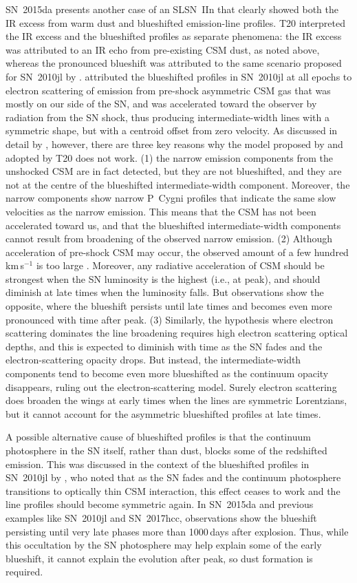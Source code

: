 \documentclass[fleqn,usenatbib,useAMS]{mnras}
\begin{document}
SN~2015da presents another case of an SLSN~IIn that clearly showed both
the IR excess from warm dust and blueshifted emission-line profiles.
T20 interpreted the IR excess and the blueshifted profiles as separate
phenomena: the IR excess was attributed to an IR echo from
pre-existing CSM dust, as noted above, whereas the pronounced
blueshift was attributed to the same scenario proposed for SN~2010jl
by \citet{fransson14}.  \citet{fransson14} attributed the blueshifted
profiles in SN~2010jl at all epochs to electron scattering of emission
from pre-shock asymmetric CSM gas that was mostly on our side of the
SN, and was accelerated toward the observer by radiation from the SN
shock, thus producing intermediate-width lines with a symmetric shape,
but with a centroid offset from zero velocity.  As discussed in detail
by \citet{smith20}, however, there are three key reasons why the model
proposed by \citet{fransson14} and adopted by T20 does not work.  (1)
the narrow emission components from the unshocked CSM are in fact
detected, but they are not blueshifted, and they are not at the centre
of the blueshifted intermediate-width component.  Moreover, the narrow
components show narrow P~Cygni profiles that indicate the same slow
velocities as the narrow emission.  This means that the CSM has not
been accelerated toward us, and that the blueshifted intermediate-width components
cannot result from broadening of the observed narrow emission.  (2) Although
acceleration of pre-shock CSM may occur, the observed amount of a few
hundred km\,s$^{-1}$ is too large \citep{dessart15}.  Moreover, any
radiative acceleration of CSM should be strongest when the SN
luminosity is the highest (i.e., at peak), and should diminish at late
times when the luminosity falls.  But observations show the opposite,
where the blueshift persists until late times and becomes even more
pronounced with time after peak.  (3) Similarly, the hypothesis where electron
scattering dominates the line broadening requires high electron
scattering optical depths, and this is expected to diminish with time
as the SN fades and the electron-scattering opacity drops.  But
instead, the intermediate-width components tend to become even more blueshifted
as the continuum opacity disappears, ruling out the electron-scattering
model.  Surely electron scattering does broaden the wings at early times when the
lines are symmetric Lorentzians, but it cannot account for the
asymmetric blueshifted profiles at late times.

A possible alternative cause of blueshifted profiles is that the continuum
photosphere in the SN itself, rather than dust, blocks some of the
redshifted emission. This was discussed in the context of
the blueshifted profiles in SN~2010jl by \citet{smith12}, who noted
that as the SN fades and the continuum photosphere transitions to
optically thin CSM interaction, this effect ceases to work and the
line profiles should become symmetric again.  In SN~2015da and previous
examples like SN~2010jl and SN~2017hcc, observations show the blueshift
persisting until very late phases more than 1000\,days after explosion.
Thus, while this occultation by the SN photosphere may help explain
some of the early blueshift, it cannot explain the evolution after peak, so
dust formation is required.
\end{document}
